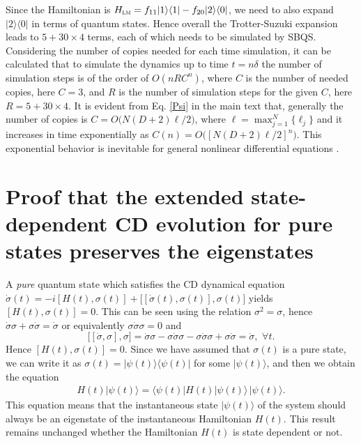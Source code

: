 \documentclass[aps,pra,twocolumn,floatfix,groupedaddress,superscriptaddress,nofootinbib,notitlepage]{revtex4-2}
\begin{document}
Since the Hamiltonian is $H_{\textsc{lm}} = f_{11}|1\rangle \langle 1| - f_{20}|2\rangle \langle 0|$, we need to also expand $|2\rangle \langle 0|$ in terms of  quantum states. Hence overall the Trotter-Suzuki expansion leads to $5+ 30 \times 4$ terms, each of which needs to be simulated by SBQS. Considering the number of copies needed for each time simulation, it can be calculated that to simulate the dynamics up to time $t=n \delta$ the number of simulation steps is of the order of $O(n R C^{n})$, where $C$ is the number of needed copies, here $C=3$, and $R$ is the number of simulation steps for the given $C$, here $R= 5+30 \times 4$. It is evident from Eq. \eqref{Psi} in the main text that, generally the number of copies is $C= O\big(N(D+2)\ell/2\big)$, where $\ell = \max_{j=1}^{N} \{\ell_{j}\}$ and it increases in time  exponentially as $C(n) = O\big([N(D+2)\ell/2]^{n}\big)$. This exponential behavior is inevitable for general nonlinear differential equations  \cite{Childs-1,Childs-dissipative-NL}. 

\section{Proof that the extended state-dependent CD evolution for pure states preserves the eigenstates}
\label{app:proof-cd}

A \textit{pure} quantum state which satisfies the CD dynamical equation $\dot{\sigma}(t)=-i[H(t), \sigma(t)]+\big[[\dot{\sigma}(t), \sigma(t)],\sigma(t)\big]$ yields $[H(t), \sigma(t)]=0$. This can be seen using the relation $\sigma^{2}=\sigma$, hence $\dot{\sigma}\sigma+\sigma \dot{\sigma}=\dot{\sigma}$ or equivalently $\sigma \dot{\sigma} \sigma=0$ and
\begin{equation}
\big[[\dot{\sigma}, \sigma],\sigma\big]= \dot{\sigma}\sigma-\sigma \dot{\sigma}\sigma-\sigma\dot{\sigma}\sigma +\sigma \dot{\sigma} = \dot{\sigma},\,\,\forall t.
\end{equation}
Hence $[H(t),\sigma(t)]=0$. Since we have assumed that $\sigma(t)$ is a pure state, we can write it as $\sigma(t) = |\psi(t)\rangle\langle \psi(t)|$ for some $|\psi(t)\rangle$, and then we obtain the equation
\begin{align}
H(t)|\psi (t)\rangle=\langle \psi (t) | H(t)| \psi(t) \rangle \, |\psi(t)\rangle.
\label{g1}
\end{align}
This equation means that the instantaneous state $|\psi(t)\rangle$ of the system should always be an eigenstate of the instantaneous Hamiltonian $H(t)$. This result remains unchanged whether the Hamiltonian $H(t)$ is state dependent or not. 
\end{document}
